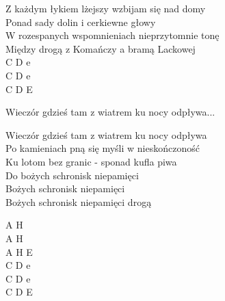 \documentclass{report}
\begin{document}
\begin{paracol}{2}
Z każdym łykiem lżejszy wzbijam się nad domy\\
Ponad sady dolin i cerkiewne głowy\\
W rozespanych wspomnieniach nieprzytomnie tonę\\
Między drogą z Komańczy a bramą Lackowej\\

\switchcolumn
\vspace{\baselineskip}
\vspace{\baselineskip}
\vspace{\baselineskip}
C D e\\
C D e\\
C D E\\

\end{paracol}
\begin{paracol}{2}
\begin{chorus}
Wieczór gdzieś tam z wiatrem ku nocy odpływa...\\
\end{chorus}

\switchcolumn

\end{paracol}
\begin{paracol}{2}
\begin{chorus}
Wieczór gdzieś tam z wiatrem ku nocy odpływa\\
Po kamieniach pną się myśli w nieskończoność\\
Ku lotom bez granic - sponad kufla piwa\\
Do bożych schronisk niepamięci\\
Bożych schronisk niepamięci\\
Bożych schronisk niepamięci drogą\\
\end{chorus}

\switchcolumn
\vspace{\baselineskip}
\vspace{\baselineskip}
\vspace{\baselineskip}
A H\\
A H\\
A H E\\
C D e\\
C D e\\
C D E\\
\vspace{\baselineskip}
\vspace{\baselineskip}

\end{paracol}
\newpage
\end{document}
